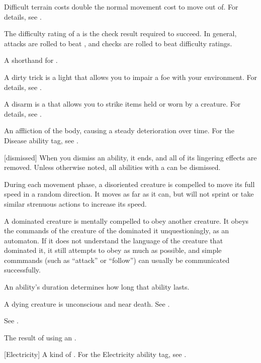  Difficult terrain costs double the normal movement cost to move out of.
For details, see .

 The difficulty rating of a  is the check result required to succeed.
In general, attacks are rolled to beat , and checks are rolled to beat difficulty ratings.

 A shorthand for .

 A dirty trick is a light  that allows you to impair a foe with your environment.
For details, see .

 A disarm is a  that allows you to strike items held or worn by a creature.
For details, see .

 An affliction of the body, causing a steady deterioration over time. For the Disease ability tag, see .

[dismissed] When you dismiss an ability, it ends, and all of its lingering effects are removed.
Unless otherwise noted, all abilities with a  can be dismissed.

 During each movement phase, a disoriented creature is compelled to move its full speed in a random direction.
It moves as far as it can, but will not sprint or take similar strenuous actions to increase its speed.

 A dominated creature is mentally compelled to obey another creature.
It obeys the commands of the creature of the dominated it unquestioningly, as an automaton.
If it does not understand the language of the creature that dominated it, it still attempts to obey as much as possible, and simple commmands (such as ``attack'' or ``follow'') can usually be communicated successfully.

 An ability's duration determines how long that ability lasts.

 A dying creature is unconscious and near death. See .

 See .

 The result of using an .

[Electricity] A kind of . For the Electricity ability tag, see .

